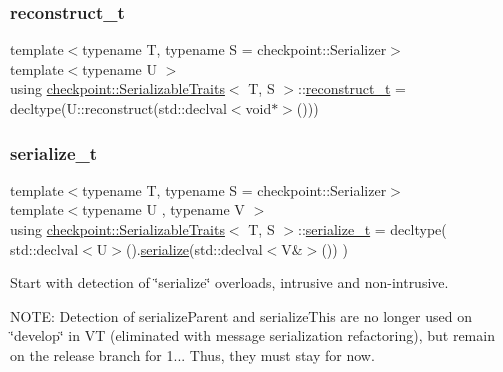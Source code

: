 \mbox{\label{structcheckpoint_1_1_serializable_traits_a9f161977ecf1aed8a4ccd5d63768399a}} 
\subsubsection{\texorpdfstring{reconstruct\+\_\+t}{reconstruct\_t}}
{\footnotesize\ttfamily template$<$typename T, typename S = checkpoint\+::\+Serializer$>$ \\
template$<$typename U $>$ \\
using \hyperlink{structcheckpoint_1_1_serializable_traits}{checkpoint\+::\+Serializable\+Traits}$<$ T, S $>$\+::\hyperlink{structcheckpoint_1_1_serializable_traits_a9f161977ecf1aed8a4ccd5d63768399a}{reconstruct\+\_\+t} =  decltype(U\+::reconstruct(std\+::declval$<$void$\ast$$>$()))}

\mbox{\label{structcheckpoint_1_1_serializable_traits_a416ff19cd1038279ace5cb49e3a9fb7d}} 
\subsubsection{\texorpdfstring{serialize\+\_\+t}{serialize\_t}}
{\footnotesize\ttfamily template$<$typename T, typename S = checkpoint\+::\+Serializer$>$ \\
template$<$typename U , typename V $>$ \\
using \hyperlink{structcheckpoint_1_1_serializable_traits}{checkpoint\+::\+Serializable\+Traits}$<$ T, S $>$\+::\hyperlink{structcheckpoint_1_1_serializable_traits_a416ff19cd1038279ace5cb49e3a9fb7d}{serialize\+\_\+t} =  decltype( std\+::declval$<$U$>$().\hyperlink{namespacecheckpoint_a075da4e7344cf037943362517e606c3a}{serialize}(std\+::declval$<$V\&$>$()) )}

Start with detection of \char`\"{}serialize\char`\"{} overloads, intrusive and non-\/intrusive.

N\+O\+TE\+: Detection of {\ttfamily serialize\+Parent} and {\ttfamily serialize\+This} are no longer used on \char`\"{}develop\char`\"{} in VT (eliminated with message serialization refactoring), but remain on the release branch for 1... Thus, they must stay for now. \mbox{\label{structcheckpoint_1_1_serializable_traits_a38585e5b9aa0653c08ff48504e922ad5}} 
